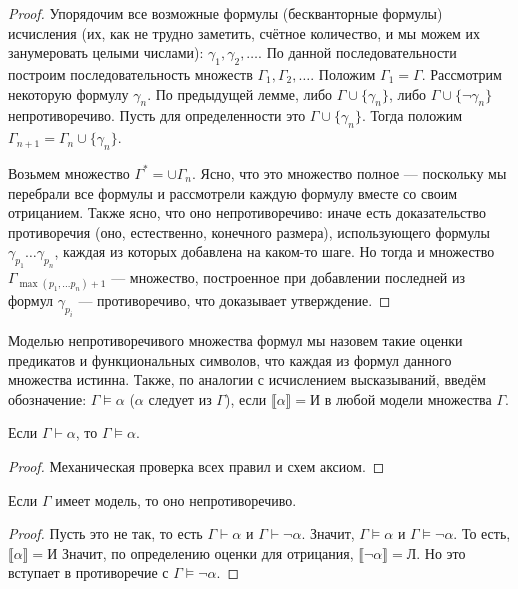 \begin{proof}
Упорядочим все возможные формулы (бескванторные формулы) 
исчисления (их, как не трудно заметить,
счётное количество, и мы можем их занумеровать целыми числами):
$\gamma_1, \gamma_2, \dots$. По данной последовательности построим
последовательность множеств $\Gamma_1, \Gamma_2, \dots$.
Положим $\Gamma_1 = \Gamma$.
Рассмотрим некоторую формулу $\gamma_n$. По предыдущей лемме, либо 
$\Gamma \cup \{\gamma_n\}$, либо $\Gamma \cup \{\neg\gamma_n\}$ 
непротиворечиво. Пусть для определенности это $\Gamma \cup \{\gamma_n\}$.
Тогда положим $\Gamma_{n+1} = \Gamma_n \cup \{\gamma_n\}$.

Возьмем множество $\Gamma^* = \cup \Gamma_n$. Ясно, что это множество
полное --- поскольку мы перебрали все формулы и рассмотрели каждую
формулу вместе со своим отрицанием.
Также ясно, что оно непротиворечиво: иначе есть
доказательство противоречия (оно, естественно, конечного размера),
использующего формулы $\gamma_{p_1} \dots \gamma_{p_n}$, каждая из которых
добавлена на каком-то шаге. Но тогда и множество 
$\Gamma_{\max(p_1, \dots p_n)+1}$ --- множество, построенное при добавлении
последней из формул $\gamma_{p_i}$ --- противоречиво, что доказывает 
утверждение.
\end{proof}

\begin{definition}
Моделью непротиворечивого множества формул мы назовем такие
оценки предикатов и функциональных символов, что каждая из формул данного
множества истинна. Также, по аналогии с исчислением высказываний,
введём обозначение: $\Gamma \models \alpha$ ($\alpha$ следует из $\Gamma$), 
если $\llbracket \alpha \rrbracket = \texttt{И}$ в любой модели
множества $\Gamma$.
\end{definition}

\begin{theorem}
Если $\Gamma \vdash \alpha$, то $\Gamma \models \alpha$.
\end{theorem}

\begin{proof}
Механическая проверка всех правил и схем аксиом.
\end{proof}

\begin{theorem}
Если $\Gamma$ имеет модель, то оно непротиворечиво.
\end{theorem}

\begin{proof}
Пусть это не так, то есть $\Gamma \vdash \alpha$ и $\Gamma \vdash \neg \alpha$.
Значит, $\Gamma \models \alpha$ и $\Gamma \models \neg \alpha$. То есть,
$\llbracket \alpha \rrbracket = \texttt{И}$
Значит, по определению оценки для отрицания, $\llbracket \neg\alpha \rrbracket = \texttt{Л}$.
Но это вступает в противоречие с $\Gamma \models \neg \alpha$.
\end{proof}

